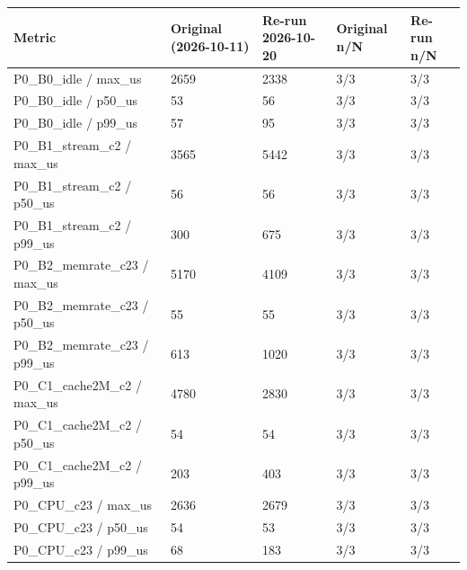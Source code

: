 \begin{tabular}{@{}lllll@{}}
\toprule
Metric & Original (2026-10-11) & Re-run 2026-10-20 & Original n/N & Re-run n/N \\
\midrule
P0\_B0\_idle / max\_us & 2659 & 2338 & 3/3 & 3/3 \\
P0\_B0\_idle / p50\_us & 53 & 56 & 3/3 & 3/3 \\
P0\_B0\_idle / p99\_us & 57 & 95 & 3/3 & 3/3 \\
P0\_B1\_stream\_c2 / max\_us & 3565 & 5442 & 3/3 & 3/3 \\
P0\_B1\_stream\_c2 / p50\_us & 56 & 56 & 3/3 & 3/3 \\
P0\_B1\_stream\_c2 / p99\_us & 300 & 675 & 3/3 & 3/3 \\
P0\_B2\_memrate\_c23 / max\_us & 5170 & 4109 & 3/3 & 3/3 \\
P0\_B2\_memrate\_c23 / p50\_us & 55 & 55 & 3/3 & 3/3 \\
P0\_B2\_memrate\_c23 / p99\_us & 613 & 1020 & 3/3 & 3/3 \\
P0\_C1\_cache2M\_c2 / max\_us & 4780 & 2830 & 3/3 & 3/3 \\
P0\_C1\_cache2M\_c2 / p50\_us & 54 & 54 & 3/3 & 3/3 \\
P0\_C1\_cache2M\_c2 / p99\_us & 203 & 403 & 3/3 & 3/3 \\
P0\_CPU\_c23 / max\_us & 2636 & 2679 & 3/3 & 3/3 \\
P0\_CPU\_c23 / p50\_us & 54 & 53 & 3/3 & 3/3 \\
P0\_CPU\_c23 / p99\_us & 68 & 183 & 3/3 & 3/3 \\
\bottomrule
\end{tabular}

